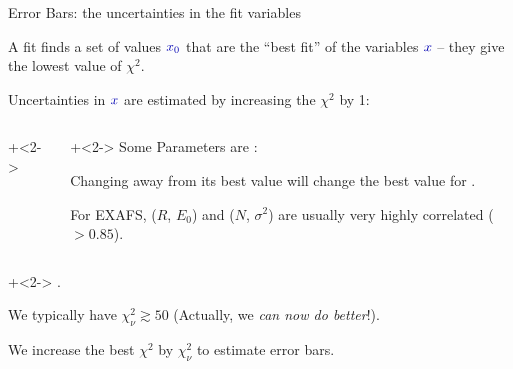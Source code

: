 \begin{slide}{Error Bars: the uncertainties in the fit variables}

\begin{cenpage}{125mm}
A fit finds a set of values $\Blue{x_0}$ that are the ``best fit'' of the variables
$\Blue{x}$ -- they give the lowest value of  $\chi^2$.

\begin{center} Uncertainties in $\Blue{x}$ are estimated by increasing the
  $\chi^2$ by 1: \end{center}


\begin{columns}
\begin{column}{58mm}

\onslide+<2->


\end{column}
\begin{column}{55mm}

{\onslide+<2->
Some Parameters are {}:

\vmm

Changing {} away from its best value will change the best value
for {}.

\vmm

\begin{postitbox}{53mm}
  For EXAFS, ($R$, $E_0$) and ($N$, $\sigma^2$) are usually very highly
  correlated ($>0.85$).
\end{postitbox}
\vmm
}
\end{column}
\end{columns}

 \onslide+<2-> \vmm
 {}.

 \vmm We typically have  $\chi^2_\nu \gtrsim 50$  (Actually, we  {\emph{can
     now do better}}!).

\vmm
We increase the best $\chi^2$ by $\chi^2_\nu$ to estimate error bars.


\vmm \vmm
\end{cenpage}

\end{slide}




